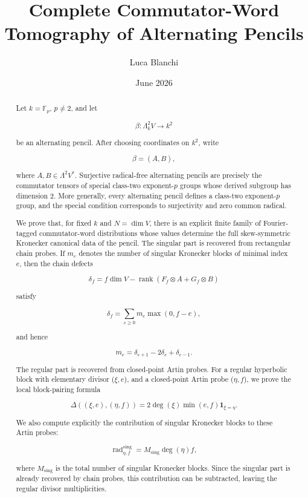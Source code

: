 \documentclass[11pt]{article}
\title{Complete Commutator-Word Tomography of Alternating Pencils}
\author{Luca Blanchi}
\date{June 2026}
\begin{document}
\maketitle

\begin{abstract}
Let $k=\mathbb F_p$, $p\neq2$, and let

\[
\beta:\Lambda^2_k V\to k^2
\]

be an alternating pencil. After choosing coordinates on $k^2$, write

\[
\beta=(A,B),
\]

where $A,B\in\Lambda^2V^*$. Surjective radical-free alternating pencils are precisely the commutator tensors of special class-two exponent-$p$ groups whose derived subgroup has dimension $2$. More generally, every alternating pencil defines a class-two exponent-$p$ group, and the special condition corresponds to surjectivity and zero common radical.

We prove that, for fixed $k$ and $N=\dim V$, there is an explicit finite family of Fourier-tagged commutator-word distributions whose values determine the full skew-symmetric Kronecker canonical data of the pencil. The singular part is recovered from rectangular chain probes. If $m_e$ denotes the number of singular Kronecker blocks of minimal index $e$, then the chain defects

\[
\delta_f
=
f\dim V-\operatorname{rank}(F_f\otimes A+G_f\otimes B)
\]

satisfy

\[
\delta_f=\sum_{e\ge0}m_e\max(0,f-e),
\]

and hence

\[
m_e=\delta_{e+1}-2\delta_e+\delta_{e-1}.
\]

The regular part is recovered from closed-point Artin probes. For a regular hyperbolic block with elementary divisor ($\xi,e$), and a closed-point Artin probe ($\eta,f$), we prove the local block-pairing formula

\[
\Delta((\xi,e),(\eta,f))
=
2\deg(\xi)\min(e,f)\mathbf 1_{\xi=\eta}.
\]

We also compute explicitly the contribution of singular Kronecker blocks to these Artin probes:

\[
\operatorname{rad}_{\eta,f}^{\mathrm{sing}}
=
M_{\mathrm{sing}}\deg(\eta)f,
\]

where $M_{\mathrm{sing}}$ is the total number of singular Kronecker blocks. Since the singular part is already recovered by chain probes, this contribution can be subtracted, leaving the regular divisor multiplicities.


\end{abstract}
\end{document}
